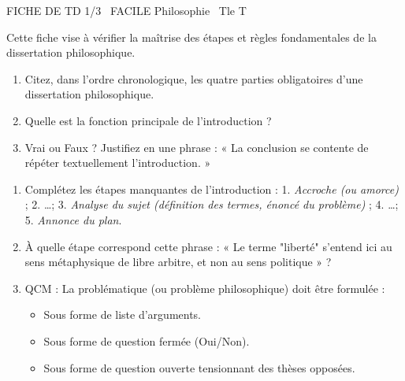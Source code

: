 \documentclass[11pt]{article}
\begin{document}
\begin{tcolorbox}[enhanced,colback=popink,colframe=popink,arc=10pt,boxrule=0pt,left=12pt,right=12pt,top=9pt,bottom=9pt]
{\color{white}\popxbold\small FICHE DE TD 1/3 \textbullet\ FACILE \hfill Philosophie \textbullet\ Tle T\par}
\end{tcolorbox}
\vspace{4pt}
\noindent Cette fiche vise à vérifier la maîtrise des étapes et règles fondamentales de la dissertation philosophique.

\begin{exercice}
\begin{enumerate}
    \item Citez, dans l'ordre chronologique, les quatre parties obligatoires d'une dissertation philosophique.
    \item Quelle est la fonction principale de l'introduction ?
    \item Vrai ou Faux ? Justifiez en une phrase : « La conclusion se contente de répéter textuellement l'introduction. »
\end{enumerate}
\end{exercice}

\begin{exercice}
\begin{enumerate}
    \item Complétez les étapes manquantes de l'introduction : 1. \textit{Accroche (ou amorce)} ; 2. \dots ; 3. \textit{Analyse du sujet (définition des termes, énoncé du problème)} ; 4. \dots ; 5. \textit{Annonce du plan}.
    \item À quelle étape correspond cette phrase : « Le terme "liberté" s'entend ici au sens métaphysique de libre arbitre, et non au sens politique » ?
    \item QCM : La problématique (ou problème philosophique) doit être formulée :
    \begin{itemize}
        \item[A.] Sous forme de liste d'arguments.
        \item[B.] Sous forme de question fermée (Oui/Non).
        \item[C.] Sous forme de question ouverte tensionnant des thèses opposées.
    \end{itemize}
\end{enumerate}
\end{exercice}
\end{document}
